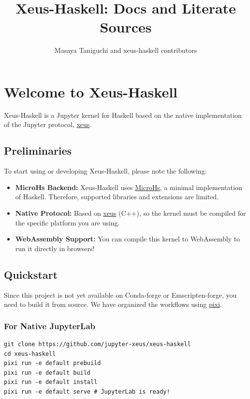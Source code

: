 \documentclass[11pt]{scrartcl}
\title{Xeus-Haskell: Docs and Literate Sources}
\author{Masaya Taniguchi and xeus-haskell contributors}
\date{}
\begin{document}
\maketitle
\tableofcontents
\newpage

\section{Welcome to Xeus-Haskell}


Xeus-Haskell is a Jupyter kernel for Haskell based on the native implementation of the Jupyter protocol, \href{https://github.com/jupyter-xeus/xeus}{xeus}.
\subsection{Preliminaries}


To start using or developing Xeus-Haskell, please note the following:
\begin{itemize}
\item \textbf{MicroHs Backend:} Xeus-Haskell uses \href{https://github.com/augustss/MicroHs}{MicroHs}, a minimal implementation of Haskell. Therefore, supported libraries and extensions are limited.
\item \textbf{Native Protocol:} Based on \href{https://github.com/jupyter-xeus/xeus}{xeus} (C++), so the kernel must be compiled for the specific platform you are using.
\item \textbf{WebAssembly Support:} You can compile this kernel to WebAssembly to run it directly in browsers!
\end{itemize}


\subsection{Quickstart}


Since this project is not yet available on Conda-forge or Emscripten-forge, you need to build it from source. We have organized the workflows using \href{https://pixi.sh}{pixi}.
\subsubsection{For Native JupyterLab}


\begin{verbatim}
git clone https://github.com/jupyter-xeus/xeus-haskell
cd xeus-haskell
pixi run -e default prebuild
pixi run -e default build
pixi run -e default install
pixi run -e default serve # JupyterLab is ready!
\end{verbatim}
\end{document}
